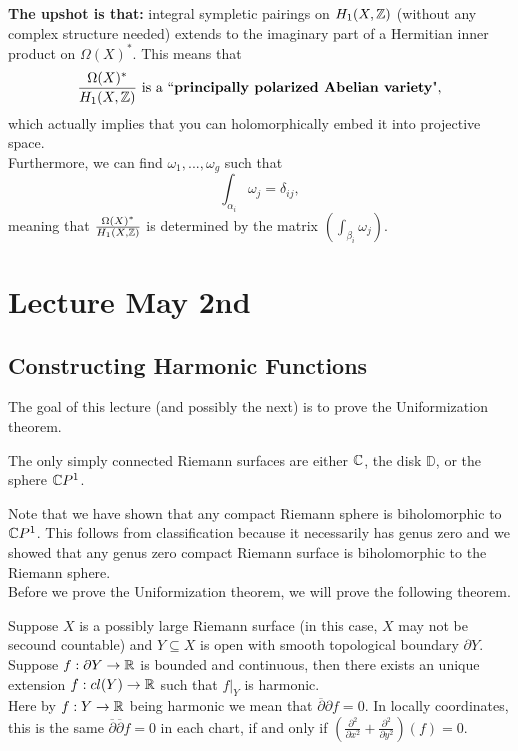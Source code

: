 \documentclass{article}
\begin{document}
{\textbf{The upshot is that:} integral sympletic pairings on $H_1(X, \mathbb{Z})$ (without any complex structure needed) extends to the imaginary part of a Hermitian inner product on $\Omega(X)^*$. This means that
\[\frac{\Omega(X)^*}{H_1(X, \mathbb{Z})} \text{ is a ``\textbf{principally polarized Abelian variety}"},\]
which actually implies that you can holomorphically embed it into projective space.\\

Furthermore, we can find $\omega_1, ..., \omega_g$ such that
\[\int_{\alpha_i} \omega_j = \delta_{ij},\]
meaning that $\frac{\Omega(X)^*}{H_1(X, \mathbb{Z})}$ is determined by the matrix $(\int_{\beta_i} \omega_j)$.

\newpage
\section{Lecture May 2nd}

\subsection{Constructing Harmonic Functions}

The goal of this lecture (and possibly the next) is to prove the Uniformization theorem.
\begin{theorem}
    The only simply connected Riemann surfaces are either $\mathbb{C}$, the disk $\mathbb{D}$, or the sphere $\mathbb{C} P^1$.
\end{theorem}

Note that we have shown that any compact Riemann sphere is biholomorphic to $\mathbb{C} P^1$. This follows from classification because it necessarily has genus zero and we showed that any genus zero compact Riemann surface is biholomorphic to the Riemann sphere.\\

Before we prove the Uniformization theorem, we will prove the following theorem.

\begin{theorem}\label{thm::perron}
    Suppose $X$ is a possibly large Riemann surface (in this case, $X$ may not be secound countable) and $Y \subseteq X$ is open with smooth topological boundary $\partial Y$. Suppose $f: \partial Y \to \mathbb{R}$ is bounded and continuous, then there exists an unique extension $f: cl(Y) \to \mathbb{R}$ such that $f|_Y$ is harmonic.\\

    Here by $f: Y \to \mathbb{R}$ being harmonic we mean that $\overline{\partial} \partial f = 0$. In locally coordinates, this is the same $\overline{\partial} \overline{\partial} f = 0$ in each chart, if and only if $(\frac{\partial^2}{\partial x^2} + \frac{\partial^2}{\partial y^2})(f) = 0$.
\end{theorem}

}
\end{document}
